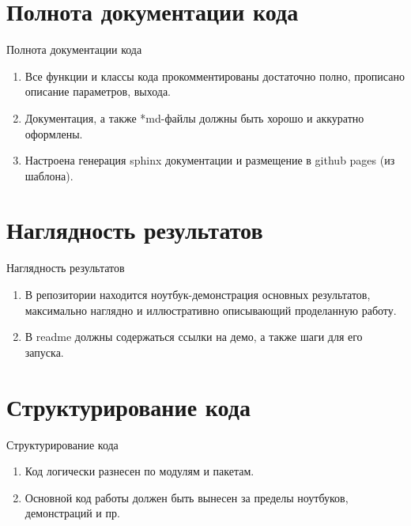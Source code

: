 \documentclass[10pt,pdf,hyperref={unicode}]{beamer}
\begin{document}
\section{Полнота документации кода}
\begin{frame}{Полнота документации кода}
\bigskip
\begin{enumerate}
    \item Все функции и классы кода прокомментированы достаточно полно, прописано описание параметров, выхода.
    \item Документация, а также *md-файлы должны быть хорошо и аккуратно оформлены.
    \item Настроена генерация sphinx документации и размещение в github pages (из шаблона).
\end{enumerate}
\end{frame}
\section{Наглядность результатов}
\begin{frame}{Наглядность результатов}
\bigskip
\begin{enumerate}
    \item В репозитории находится ноутбук-демонстрация основных результатов, максимально наглядно и иллюстративно описывающий проделанную работу.
    \item В readme должны содержаться ссылки на демо, а также шаги для его запуска.
\end{enumerate}
\end{frame}
\section{Структурирование кода}
\begin{frame}{Структурирование кода}
\bigskip
\begin{enumerate}
    \item Код логически разнесен по модулям и пакетам.
    \item Основной код работы должен быть вынесен за пределы ноутбуков, демонстраций и пр.
\end{enumerate}
\end{frame}
\end{document}

